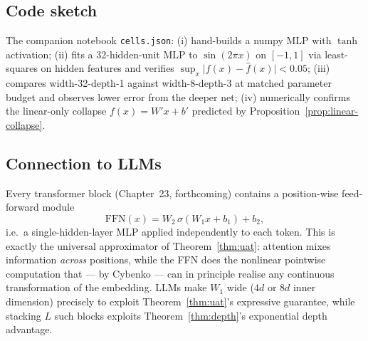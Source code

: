 \subsection*{Code sketch}

The companion notebook \texttt{cells.json}: (i) hand-builds a numpy MLP with $\tanh$ activation; (ii) fits a 32-hidden-unit MLP to $\sin(2\pi x)$ on $[-1,1]$ via least-squares on hidden features and verifies $\sup_x \lvert f(x) - \hat f(x)\rvert < 0.05$; (iii) compares width-32-depth-1 against width-8-depth-3 at matched parameter budget and observes lower error from the deeper net; (iv) numerically confirms the linear-only collapse $f(x) = W' x + b'$ predicted by Proposition~\ref{prop:linear-collapse}.

\subsection*{Connection to LLMs}

Every transformer block (Chapter~23, forthcoming) contains a position-wise feed-forward module
\[
\mathrm{FFN}(x) = W_2\, \sigma(W_1 x + b_1) + b_2,
\]
i.e.\ a single-hidden-layer MLP applied independently to each token. This is exactly the universal approximator of Theorem~\ref{thm:uat}: attention mixes information \emph{across} positions, while the FFN does the nonlinear pointwise computation that --- by Cybenko --- can in principle realise any continuous transformation of the embedding. LLMs make $W_1$ wide ($4d$ or $8d$ inner dimension) precisely to exploit Theorem~\ref{thm:uat}'s expressive guarantee, while stacking $L$ such blocks exploits Theorem~\ref{thm:depth}'s exponential depth advantage.
